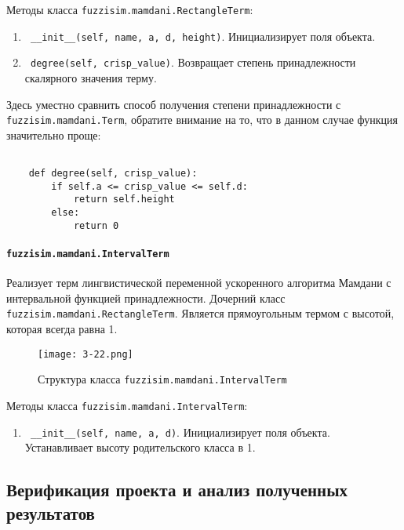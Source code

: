Методы класса \lstinline!fuzzisim.mamdani.RectangleTerm!:
\begin{enumerate}[label=\arabic*)]
	\item \lstinline! __init__(self, name, a, d, height)!. Инициализирует поля объекта.
	\item \lstinline! degree(self, crisp_value)!. Возвращает степень принадлежности скалярного значения терму.
\end{enumerate}

Здесь уместно сравнить способ получения степени принадлежности с \lstinline!fuzzisim.mamdani.Term!,
обратите внимание на то, что в данном случае функция значительно проще:
\begin{lstlisting}[style=pythonstyle,caption={  }, label=lst:func:1]

	def degree(self, crisp_value):
		if self.a <= crisp_value <= self.d:
			return self.height
		else:
			return 0
\end{lstlisting}




\paragraph{\lstinline!fuzzisim.mamdani.IntervalTerm!}

Реализует терм лингвистической переменной ускоренного алгоритма Мамдани с интервальной функцией принадлежности. Дочерний класс \lstinline!fuzzisim.mamdani.RectangleTerm!. Является прямоугольным термом с высотой, которая всегда равна 1.

\begin{figure}[ht]
	\centering
	\texttt{[image: 3-22.png]}
	\caption{ Структура класса \lstinline!fuzzisim.mamdani.IntervalTerm!}
\end{figure}



Методы класса \lstinline!fuzzisim.mamdani.IntervalTerm!:
\begin{enumerate}[label=\arabic*)]
	\item \lstinline! __init__(self, name, a, d)!. Инициализирует поля объекта.  Устанавливает высоту родительского класса в 1.
\end{enumerate}

\subsection{Верификация проекта и анализ полученных результатов}

